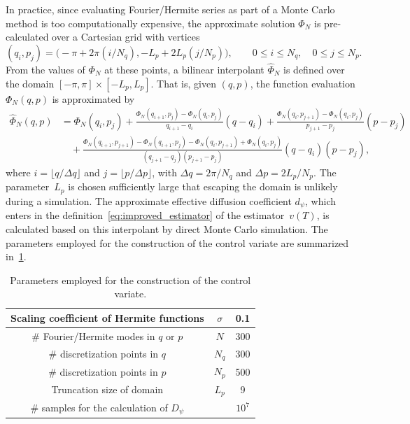 \documentclass[11pt,a4paper]{article}
\theoremstyle{plain}
\numberwithin{equation}{section}
\renewcommand{\leq}{\leqslant}
\begin{document}
In practice, since evaluating Fourier/Hermite series as part of a Monte Carlo method is too computationally expensive,
the approximate solution $\Phi_N$ is pre-calculated over a Cartesian grid with vertices
\[
    (q_i, p_j) = \bigl(- \pi + 2\pi(i/N_q) , - L_p + 2L_p (j/N_p) \bigr), \qquad 0 \leq i \leq N_q, \quad 0 \leq j \leq N_p.
\]
From the values of $\Phi_N$ at these points,
a bilinear interpolant $\widehat \Phi_N$ is defined over the domain $[-\pi, \pi] \times [-L_p, L_p]$.
That is, given $(q, p)$, the function evaluation $\Phi_N(q, p)$ is approximated by
\begin{align*}
    \widehat \Phi_N(q, p)
    &= \Phi_N(q_i,p_j) + \frac{\Phi_N(q_{i+1}, p_j) - \Phi_N(q_i, p_j)}{q_{i+1} - q_i} (q - q_i)
    +\frac{\Phi_N(q_{i}, p_{j+1}) - \Phi_N(q_{i}, p_{j})}{p_{j+1} - p_j} (p - p_j) \\
    &\quad + \frac{\Phi_N(q_{i+1}, p_{j+1}) - \Phi_N(q_{i+1}, p_{j}) - \Phi_N(q_{i}, p_{j+1}) + \Phi_N(q_{i}, p_{j})}{(q_{j+1} - q_j)(p_{j+1} - p_j)}  (q-q_i)(p-p_j),
\end{align*}
where $i = \lfloor q / \Delta q \rfloor$ and $j = \lfloor p / \Delta p \rfloor$,
with $\Delta q = 2\pi/N_q$ and $\Delta p = 2L_p/N_p$.
The parameter~$L_p$ is chosen sufficiently large that escaping the domain is unlikely during a simulation.
The approximate effective diffusion coefficient $d_\psi$,
which enters in the definition~\eqref{eq:improved_estimator} of the estimator~$v(T)$,
is calculated based on this interpolant by direct Monte Carlo simulation.
The parameters employed for the construction of the control variate are summarized in~\cref{table:parameters_employed_for_the_construction_of_the_control_variate}.
\begin{table}[ht]
    \centering
    \begin{tabular}{|c|c|c|}
        \hline
        Scaling coefficient of Hermite functions & $\sigma$ & 0.1 \\
        \hline
        \# Fourier/Hermite modes in $q$ or $p$ & $N$ & 300 \\
        \hline
        \# discretization points in $q$ & $N_q$ & 300 \\
        \hline
        \# discretization points in $p$ & $N_p$ & 500 \\
        \hline
        Truncation size of domain & $L_p$ & 9 \\
        \hline
        \# samples for the calculation of $D_{\psi}$ & & $10^7$ \\
        \hline
    \end{tabular}
    \caption{Parameters employed for the construction of the control variate.}
    \label{table:parameters_employed_for_the_construction_of_the_control_variate}
\end{table}
\end{document}
